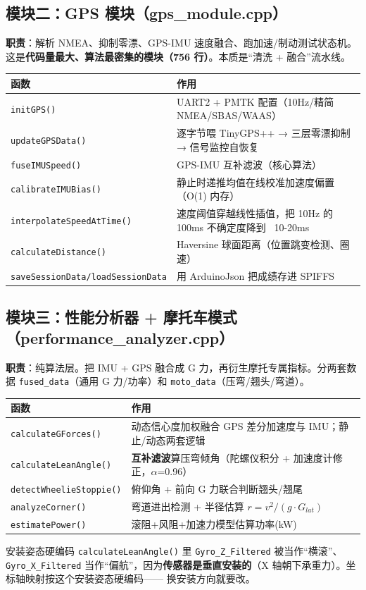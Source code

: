 \documentclass[UTF8,11pt,a4paper]{ctexart}
\begin{document}
\subsection{模块二：GPS 模块（gps_module.cpp）}
\textbf{职责}：解析 NMEA、抑制零漂、GPS-IMU 速度融合、跑加速/制动测试状态机。
这是\textbf{代码量最大、算法最密集的模块（756 行）}。本质是“清洗 + 融合”流水线。
\begin{center}\small
\begin{tabularx}{\linewidth}{@{}lX@{}}
\toprule
\textbf{函数} & \textbf{作用} \\
\midrule
\texttt{initGPS()} & UART2 + PMTK 配置（10Hz/精简NMEA/SBAS/WAAS） \\
\texttt{updateGPSData()} & 逐字节喂 TinyGPS++ → 三层零漂抑制 → 信号监控自恢复 \\
\texttt{fuseIMUSpeed()} & GPS-IMU 互补滤波（核心算法） \\
\texttt{calibrateIMUBias()} & 静止时递推均值在线校准加速度偏置（O(1) 内存） \\
\texttt{interpolateSpeedAtTime()} & 速度阈值穿越线性插值，把 10Hz 的 100ms 不确定度降到 ~10-20ms \\
\texttt{calculateDistance()} & Haversine 球面距离（位置跳变检测、圈速） \\
\texttt{saveSessionData/loadSessionData} & 用 ArduinoJson 把成绩存进 SPIFFS \\
\bottomrule
\end{tabularx}
\end{center}

\subsection{模块三：性能分析器 + 摩托车模式（performance_analyzer.cpp）}
\textbf{职责}：纯算法层。把 IMU + GPS 融合成 G 力，再衍生摩托专属指标。分两套数据
\texttt{fused\_data}（通用 G 力/功率）和 \texttt{moto\_data}（压弯/翘头/弯道）。
\begin{center}\small
\begin{tabularx}{\linewidth}{@{}lX@{}}
\toprule
\textbf{函数} & \textbf{作用} \\
\midrule
\texttt{calculateGForces()} & 动态信心度加权融合 GPS 差分加速度与 IMU；静止/动态两套逻辑 \\
\texttt{calculateLeanAngle()} & \textbf{互补滤波}算压弯倾角（陀螺仪积分 + 加速度计修正，\(\alpha\)=0.96） \\
\texttt{detectWheelieStoppie()} & 俯仰角 + 前向 G 力联合判断翘头/翘尾 \\
\texttt{analyzeCorner()} & 弯道进出检测 + 半径估算 $r = v^2/(g\cdot G_{lat})$ \\
\texttt{estimatePower()} & 滚阻+风阻+加速力模型估算功率(kW) \\
\bottomrule
\end{tabularx}
\end{center}
\begin{warn}{安装姿态硬编码}
\texttt{calculateLeanAngle()} 里 \texttt{Gyro\_Z\_Filtered} 被当作“横滚”、\texttt{Gyro\_X\_Filtered}
当作“偏航”，因为\textbf{传感器是垂直安装的}（X 轴朝下承重力）。坐标轴映射按这个安装姿态硬编码——
换安装方向就要改。
\end{warn}
\end{document}
